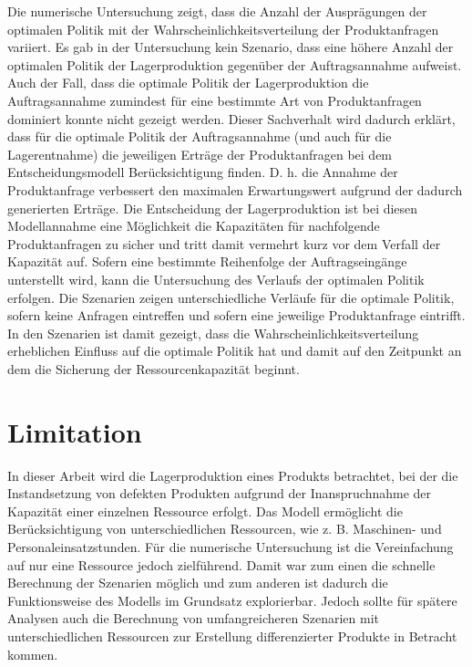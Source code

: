 Die numerische Untersuchung zeigt, dass die Anzahl der Ausprägungen der optimalen Politik mit der Wahrscheinlichkeitsverteilung der Produktanfragen variiert. Es gab in der Untersuchung kein Szenario, dass eine höhere Anzahl der optimalen Politik der Lagerproduktion gegenüber der Auftragsannahme aufweist. Auch der Fall, dass die optimale Politik der Lagerproduktion die Auftragsannahme zumindest für eine bestimmte Art von Produktanfragen dominiert konnte nicht gezeigt werden. Dieser Sachverhalt wird dadurch erklärt, dass für die optimale Politik der Auftragsannahme (und auch für die Lagerentnahme) die jeweiligen Erträge der Produktanfragen bei dem Entscheidungsmodell Berücksichtigung finden. D. h. die Annahme der Produktanfrage verbessert den maximalen Erwartungswert aufgrund der dadurch generierten Erträge. Die Entscheidung der Lagerproduktion ist bei diesen Modellannahme eine Möglichkeit die Kapazitäten für nachfolgende Produktanfragen zu sicher und tritt damit vermehrt kurz vor dem Verfall der Kapazität auf. Sofern eine bestimmte Reihenfolge der Auftragseingänge unterstellt wird, kann die Untersuchung des Verlaufs der optimalen Politik erfolgen. Die Szenarien zeigen unterschiedliche Verläufe für die optimale Politik, sofern keine Anfragen eintreffen und sofern eine jeweilige Produktanfrage eintrifft. In den Szenarien ist damit gezeigt, dass die Wahrscheinlichkeitsverteilung erheblichen Einfluss auf die optimale Politik hat und damit auf den Zeitpunkt an dem die Sicherung der Ressourcenkapazität beginnt. 

\section*{Limitation}

In dieser Arbeit wird die Lagerproduktion eines Produkts betrachtet, bei der die Instandsetzung von defekten Produkten aufgrund der Inanspruchnahme der Kapazität einer einzelnen Ressource erfolgt. Das Modell ermöglicht die Berücksichtigung von unterschiedlichen Ressourcen, wie z. B. Maschinen- und Personaleinsatzstunden. Für die numerische Untersuchung ist die Vereinfachung auf nur eine Ressource jedoch zielführend. Damit war zum einen die schnelle Berechnung der Szenarien möglich und zum anderen ist dadurch die Funktionsweise des Modells im Grundsatz explorierbar. Jedoch sollte für spätere Analysen auch die Berechnung von umfangreicheren Szenarien mit unterschiedlichen Ressourcen zur Erstellung differenzierter Produkte in Betracht kommen.

